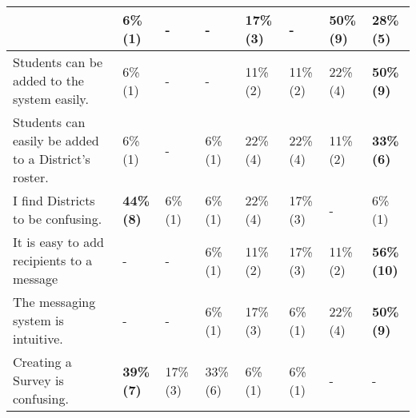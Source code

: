 \begin{table}
{\begin{tabular}{| L{8cm} |p{0.7cm}|p{0.7cm}|p{0.7cm}|p{0.7cm}|p{0.7cm}|p{0.7cm}|p{0.7cm}|}
	& 6\% \newline (1) & - & - & 17\% \newline (3) & - & \textbf{50\% \newline (9)} & 28\% \newline (5) \\
\hline Students can be added to the system easily.
	& 6\% \newline (1) & - & - & 11\% \newline (2) & 11\% \newline (2) & 22\% \newline (4) & \textbf{50\% \newline (9)} \\
\hline Students can easily be added to a District's roster.
	& 6\% \newline (1) & - & 6\% \newline (1) & 22\% \newline (4) & 22\% \newline (4) & 11\% \newline (2) & \textbf{33\% \newline (6)} \\
\hline I find Districts to be confusing.
	& \textbf{44\% \newline (8)} & 6\% \newline (1) & 6\% \newline (1) & 22\% \newline (4) & 17\% \newline (3) & - & 6\% \newline (1) \\
\hline It is easy to add recipients to a message
	& - & - & 6\% \newline (1) & 11\% \newline (2) & 17\% \newline (3) & 11\% \newline (2) & \textbf{56\% \newline (10)} \\
\hline The messaging system is intuitive.
	& - & - & 6\% \newline (1) & 17\% \newline (3) & 6\% \newline (1) & 22\% \newline (4) & \textbf{50\% \newline (9)} \\
\hline Creating a Survey is confusing.
	& \textbf{39\% \newline (7)} & 17\% \newline (3) & 33\% \newline (6) & 6\% \newline (1) & 6\% \newline (1) & - & - \\

\end{tabular}}
\end{table}
